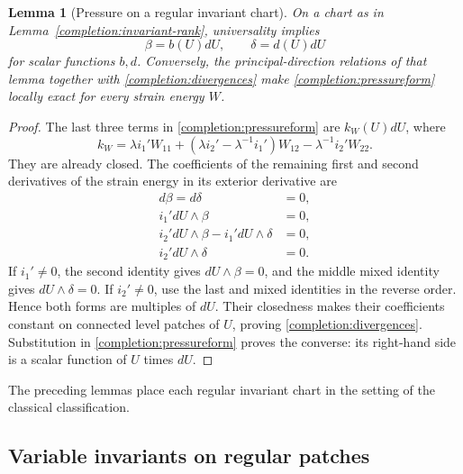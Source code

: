 \documentclass[11pt,a4paper]{article}
\numberwithin{equation}{section}
\theoremstyle{plain}
\newtheorem{lemma}[theorem]{Lemma}
\theoremstyle{definition}
\theoremstyle{remark}
\begin{document}
\begin{lemma}[Pressure on a regular invariant chart]
\label{completion:regular-pressure}
On a chart as in Lemma~\ref{completion:invariant-rank}, universality
implies
\begin{equation}\label{completion:divergences}
 \beta=b(U)dU,\qquad \delta=d(U)dU
\end{equation}
for scalar functions $b,d$. Conversely, the principal-direction
relations of that lemma together with
\eqref{completion:divergences} make
\eqref{completion:pressureform} locally exact for every strain energy $W$.
\end{lemma}
\begin{proof}
The last three terms in \eqref{completion:pressureform} are
$k_W(U)dU$, where
\[
 k_W=\lambda i_1'W_{11}
       +(\lambda i_2'-\lambda^{-1}i_1')W_{12}
       -\lambda^{-1}i_2'W_{22}.
\]
They are already closed. The coefficients of the remaining first and
second derivatives of the strain energy in its exterior derivative are
\begin{align*}
 d\beta=d\delta&=0,\\
 i_1' dU\wedge\beta&=0,\\
 i_2' dU\wedge\beta-i_1' dU\wedge\delta&=0,\\
 i_2' dU\wedge\delta&=0.
\end{align*}
If $i_1'\ne0$, the second identity gives
$dU\wedge\beta=0$, and the middle mixed identity gives
$dU\wedge\delta=0$. If $i_2'\ne0$, use the last and mixed identities
in the reverse order. Hence both forms are multiples of $dU$. Their closedness makes
their coefficients constant on connected level patches of $U$,
proving \eqref{completion:divergences}. Substitution in
\eqref{completion:pressureform} proves the converse: its right-hand
side is a scalar function of $U$ times $dU$.
\end{proof}

The preceding lemmas place each regular invariant chart in the setting
of the classical classification.

\subsection{Variable invariants on regular patches}
\label{completion:regular-classification}
\end{document}
